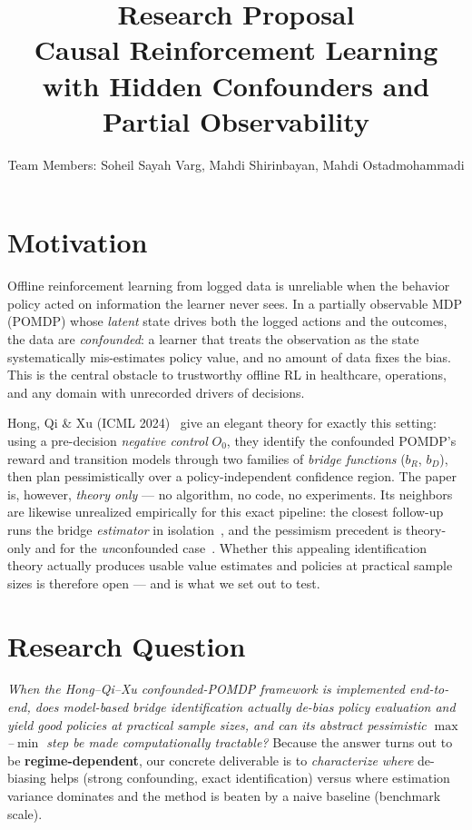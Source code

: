 \documentclass[10pt]{article}
\title{\textbf{Research Proposal}\\
Causal Reinforcement Learning with Hidden Confounders and Partial Observability}
\author{
Team Members: Soheil Sayah Varg, Mahdi Shirinbayan, Mahdi Ostadmohammadi
}
\date{}
\begin{document}
\maketitle

\section{Motivation}

Offline reinforcement learning from logged data is unreliable when the behavior policy acted on information the
learner never sees. In a partially observable MDP (POMDP) whose \emph{latent} state drives both the logged
actions and the outcomes, the data are \emph{confounded}: a learner that treats the observation as the state
systematically mis-estimates policy value, and no amount of data fixes the bias. This is the central obstacle
to trustworthy offline RL in healthcare, operations, and any domain with unrecorded drivers of decisions.

Hong, Qi \& Xu (ICML 2024)~\cite{hong2024} give an elegant theory for exactly this setting: using a
pre-decision \emph{negative control} $O_0$, they identify the confounded POMDP's reward and transition models
through two families of \emph{bridge functions} ($b_R$, $b_D$), then plan pessimistically over a
policy-independent confidence region. The paper is, however, \emph{theory only} --- no algorithm, no code, no
experiments. Its neighbors are likewise unrealized empirically for this exact pipeline: the closest follow-up
runs the bridge \emph{estimator} in isolation~\cite{venkatesh2026}, and the pessimism precedent is
theory-only and for the \emph{un}confounded case~\cite{guo2022}. Whether this appealing identification theory
actually produces usable value estimates and policies at practical sample sizes is therefore open --- and is
what we set out to test.

\section{Research Question}

\emph{When the Hong--Qi--Xu confounded-POMDP framework is implemented end-to-end, does model-based bridge
identification actually de-bias policy evaluation and yield good policies at practical sample sizes, and can
its abstract pessimistic $\max$--$\min$ step be made computationally tractable?} Because the answer turns out
to be \textbf{regime-dependent}, our concrete deliverable is to \emph{characterize where} de-biasing helps
(strong confounding, exact identification) versus where estimation variance dominates and the method is beaten
by a naive baseline (benchmark scale).
\end{document}
